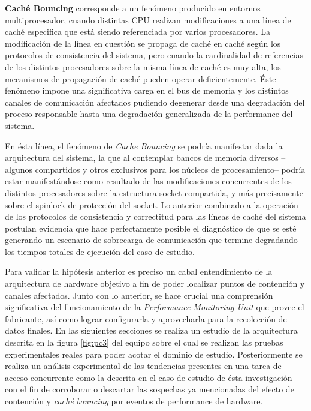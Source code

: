 \begin{defn} \textbf{Caché Bouncing} corresponde a un fenómeno producido en entornos multiprocesador, cuando distintas CPU realizan modificaciones a una línea de caché especifica que está siendo referenciada por varios procesadores. La modificación de la línea en cuestión se propaga de caché en caché según los protocolos de consistencia del sistema, pero cuando la cardinalidad de referencias de los distintos procesadores sobre la misma línea de caché es muy alta, los mecanismos de propagación de caché pueden operar deficientemente. Éste fenómeno impone una significativa carga en el bus de memoria y los distintos canales de comunicación afectados pudiendo degenerar desde una degradación del proceso responsable hasta una degradación generalizada de la performance del sistema.
\end{defn}

En ésta línea, el fenómeno de \emph{Cache Bouncing} se podría manifestar dada la arquitectura del sistema, la que al contemplar bancos de memoria diversos --algunos compartidos y otros exclusivos para los núcleos de procesamiento-- podría estar manifestándose como resultado de las modificaciones concurrentes de los distintos procesadores sobre la estructura socket compartida, y más precisamente sobre el spinlock de protección del socket. Lo anterior combinado a la operación de los protocolos de consistencia y correctitud para las líneas de caché del sistema postulan evidencia que hace perfectamente posible el diagnóstico de que se esté generando un escenario de sobrecarga de comunicación que termine degradando los tiempos totales de ejecución del caso de estudio.

Para validar la hipótesis anterior es preciso un cabal entendimiento de la arquitectura de hardware objetivo a fin de poder localizar puntos de contención y canales afectados. Junto con lo anterior, se hace crucial una comprensión significativa del funcionamiento de la \emph{Performance Monitoring Unit} que provee el fabricante, así como lograr configurarla y aprovecharla para la recolección de datos finales. En las siguientes secciones se realiza un estudio de la arquitectura descrita en la figura \ref{fig:pc3} del equipo sobre el cual se realizan las pruebas experimentales reales para poder acotar el dominio de estudio. Posteriormente se realiza un análisis experimental de las tendencias presentes en una tarea de acceso concurrente como la descrita en el caso de estudio de ésta investigación con el fin de corroborar o descartar las sospechas ya mencionadas del efecto de contención y \emph{caché bouncing} por eventos de performance de hardware.

